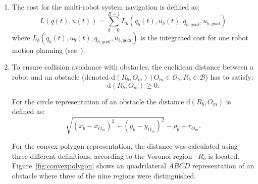 \documentclass[eprint]{actapoly}
\begin{document}
\begin{enumerate}
    \item The cost for the multi-robot system navigation is defined as:
    \begin{equation}
        L(q(t),u(t)) = \sum_{b=0}^{B-1}L_b(q_b(t), u_b(t), q_{b,goal},u_{b,goal})
    \end{equation}
    where $L_b(q_b(t), u_b(t), q_{b,goal},u_{b,goal})$ is the 
    integrated cost for one robot
    motion planning (see~\cite{Defoort2009}).
    
    \item 
    To ensure collision avoidance with obstacles, the euclidean 
    distance between
    a robot and an obstacle (denoted $\mathrm{d}(R_b, O_m)\ |\ O_m
    \in \mathcal{O}_b, R_b \in \mathcal{B} $) has to satisfy:
    \begin{equation}
    	\mathrm{d}(R_b, O_m) \geq 0.
    \end{equation}
    
    For the circle representation of an obstacle the distance
    $\mathrm{d}(R_b, O_m)$ is defined as:
    \begin{equation*}
        \sqrt{(x_{b} - x_{O_m})^2 + (y_{b} - y_{\mathrm{O}_m})^2}  - \rho_b - r_{O_m}.
    \end{equation*}
    
    For the convex polygon representation, the distance was calculated
    using three different
    definitions, according to the Voronoi region~\cite{ericson2004real}
    $R_b$ is located.
    Figure~\ref{fig:convexpolygon} shows an
    quadrilateral $ABCD$ representation of an obstacle where three of the nine
    regions were distinguished. 


    
    
    
    

\end{enumerate}
\end{document}
